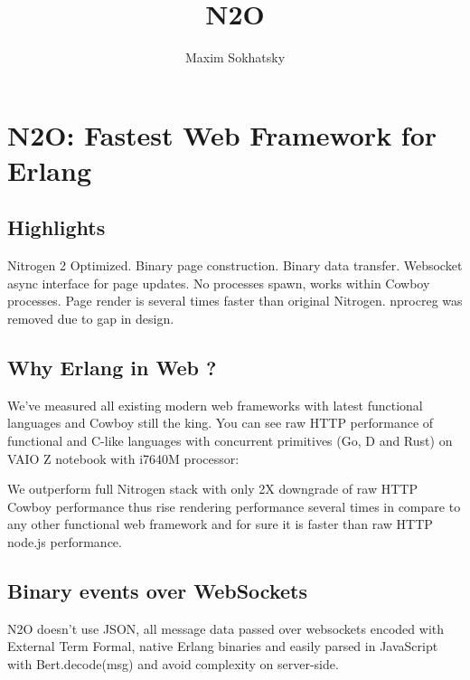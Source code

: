 \documentclass[11pt]{article}
\begin{document}
\title{N2O}
\author{Maxim Sokhatsky}

\paragraph{}
\section*{N2O: Fastest Web Framework for Erlang}

\subsection*{Highlights}
Nitrogen 2 Optimized. Binary page construction.
Binary data transfer. Websocket async interface for
page updates. No processes spawn, works within
Cowboy processes. Page render is several times faster than
original Nitrogen. nprocreg was removed due to gap in design.


\subsection*{Why Erlang in Web ?}
We've measured all existing modern web frameworks with latest functional languages and Cowboy still the king.
You can see raw HTTP performance of functional and C-like languages with concurrent primitives (Go, D and Rust)
on VAIO Z notebook with i7640M processor:


We outperform full Nitrogen stack with only 2X downgrade of raw HTTP Cowboy
performance thus rise rendering performance several times in compare to
any other functional web framework and for sure it is faster than raw HTTP node.js performance.

\subsection*{Binary events over WebSockets}
N2O doesn't use JSON, all message data passed over websockets encoded with
External Term Formal, native Erlang binaries and easily parsed in JavaScript
with Bert.decode(msg) and avoid complexity on server-side.
\end{document}
